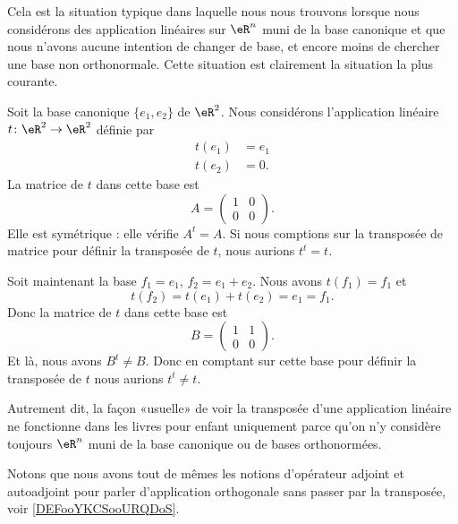 Cela est la situation typique dans laquelle nous nous trouvons lorsque nous considérons des application linéaires sur \( \eR^n\) muni de la base canonique et que nous n'avons aucune intention de changer de base, et encore moins de chercher une base non orthonormale. Cette situation est clairement la situation la plus courante.

\begin{example}
    Soit la base canonique \( \{ e_1,e_2 \}\) de \( \eR^2\). Nous considérons l'application linéaire \( t\colon \eR^2\to \eR^2\) définie par
    \begin{subequations}
        \begin{align}
            t(e_1)&=e_1\\
            t(e_2)&=0.
        \end{align}
    \end{subequations}
    La matrice de \( t\) dans cette base est
    \begin{equation}
        A=\begin{pmatrix}
            1    &   0    \\ 
            0    &   0    
        \end{pmatrix}.
    \end{equation}
    Elle est symétrique : elle vérifie \( A^t=A\). Si nous comptions sur la transposée de matrice pour définir la transposée de \( t\), nous aurions \( t^t=t\). 

    Soit maintenant la base \( f_1=e_1\), \( f_2=e_1+e_2\). Nous avons \( t(f_1)=f_1\) et
    \begin{equation}
        t(f_2)=t(e_1)+t(e_2)=e_1=f_1.
    \end{equation}
    Donc la matrice de \( t\) dans cette base est
    \begin{equation}
        B=\begin{pmatrix}
            1    &   1    \\ 
            0    &   0    
        \end{pmatrix}.
    \end{equation}
    Et là, nous avons \( B^t\neq B\). Donc en comptant sur cette base pour définir la transposée de \( t\) nous aurions \( t^t\neq t\).
\end{example}

\begin{normaltext}      \label{NooMZVRooExWVKJ}
    Autrement dit, la façon «usuelle» de voir la transposée d'une application linéaire ne fonctionne dans les livres pour enfant uniquement parce qu'on n'y considère toujours \( \eR^n\) muni de la base canonique ou de bases orthonormées.
     
    Notons que nous avons tout de mêmes les notions d'opérateur adjoint et autoadjoint pour parler d'application orthogonale sans passer par la transposée, voir \ref{DEFooYKCSooURQDoS}.
\end{normaltext}

